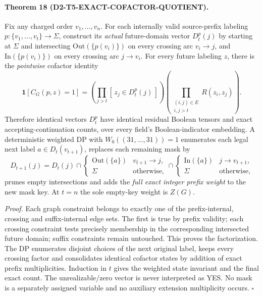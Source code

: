 \documentclass[11pt]{article}
\begin{document}
\paragraph{Theorem 18 (D2-T5-EXACT-COFACTOR-QUOTIENT).}
Fix any charged order $v_1,\ldots,v_n$.
For each internally valid source-prefix labeling
$p:\{v_1,\ldots,v_t\}\to\Sigma$, construct its
\emph{actual} future-domain vector $D_t^p(j)$ by
starting at $\Sigma$ and intersecting
$\mathrm{Out}(\{p(v_i)\})$ on every crossing arc
$v_i\to j$, and
$\mathrm{In}(\{p(v_i)\})$ on every crossing arc
$j\to v_i$.
For every future labeling $z$, there is the
\emph{pointwise} cofactor identity
\[
\mathbf1[C_G(p,z)=1]
=\left(\prod_{j>t}[\,z_j\in D_t^p(j)\,]\right)
 \left(\prod_{\substack{(i,j)\in E\\i,j>t}}
             R(z_i,z_j)\right).
\]
Therefore identical vectors $D_t^p$ have identical
residual Boolean tensors and exact accepting-continuation
counts, over every field's Boolean-indicator embedding.
A deterministic weighted DP with
$W_0((31,\ldots,31))=1$ enumerates each legal
next label $a\in D_t(v_{t+1})$, replaces each remaining
mask by
\[
D_{t+1}(j)=D_t(j)\cap
 \begin{cases}\mathrm{Out}(\{a\})&
                       v_{t+1}\to j,\\
 \Sigma&\text{otherwise,}\end{cases}
 \cap
 \begin{cases}\mathrm{In}(\{a\})&
                       j\to v_{t+1},\\
 \Sigma&\text{otherwise,}\end{cases}
\]
prunes empty intersections and adds the \emph{full
exact integer prefix weight} to the new mask key.
At $t=n$ the sole empty-key weight is $Z(G)$.

\emph{Proof.} Each graph constraint belongs to exactly
one of the prefix-internal, crossing and suffix-internal
edge sets. The first is true by prefix validity;
each crossing constraint tests precisely membership in
the corresponding intersected future domain; suffix
constraints remain untouched. This proves the factorization.
The DP enumerates disjoint choices of the next original
label, keeps every crossing factor and consolidates
identical cofactor states by addition of exact prefix
multiplicities. Induction in $t$ gives the weighted
state invariant and the final exact count. The
unrealizable/zero vector is never interpreted as YES.
No mask is a separately assigned variable and no
auxiliary extension multiplicity occurs. \hfill$\square$
\end{document}
